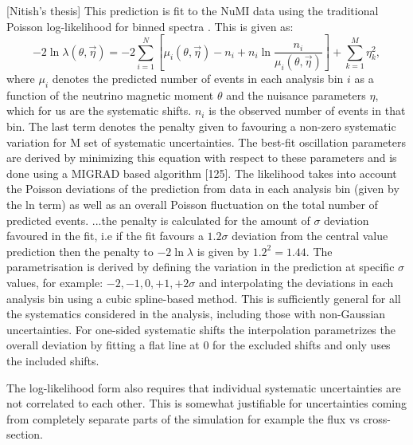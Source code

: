 
[Nitish's thesis]
This prediction is fit to the NuMI data using the traditional Poisson log-likelihood for binned spectra \cite{ExtendedMaximumLikelihood1990.pdf}. This is given as:
\begin{equation}
-2\ln\lambda\left(\theta,\overrightarrow{\eta}\right)=-2\sum_{i=1}^{N}\left[\mu_i\left(\theta,\overrightarrow{\eta}\right)-n_i+n_i\ln\frac{n_i}{\mu_i\left(\theta,\overrightarrow{\eta}\right)}\right] + \sum_{k=1}^M \eta_k^2,
\end{equation}
where $\mu_i$ denotes the predicted number of events in each analysis bin $i$ as a function of the neutrino magnetic moment $\theta$ and the nuisance parameters $\eta$, which for us are the systematic shifts. $n_i$ is the observed number of events in that bin.  The last term denotes the penalty given to favouring a non-zero systematic variation for M set of systematic uncertainties. The best-fit oscillation parameters are derived by minimizing this equation with respect to these parameters and is done using a MIGRAD based algorithm [125]. The likelihood takes into account the Poisson deviations of the prediction from data in each analysis bin (given by the ln term) as well as an overall Poisson fluctuation on the total number of predicted events. ...the penalty is calculated for the amount of $\sigma$ deviation favoured in the fit, i.e if the fit favours a $1.2\sigma$ deviation from the central value prediction then the penalty to $-2\ln\lambda$ is given by $1.2^2=1.44$. The parametrisation is derived by defining the variation in the prediction at specific $\sigma$ values, for example: $-2,-1,0,+1,+2 \sigma$ and interpolating the deviations in each analysis bin using a cubic spline-based method. This is sufficiently general for all the systematics considered in the analysis, including those with non-Gaussian uncertainties. For one-sided systematic shifts the interpolation parametrizes the overall deviation by fitting a flat line at 0 for the excluded shifts and only uses the included shifts.

The log-likelihood form also requires that individual systematic uncertainties are not correlated to each other. This is somewhat justifiable for uncertainties coming from completely separate parts of the simulation for example the flux vs cross-section.

